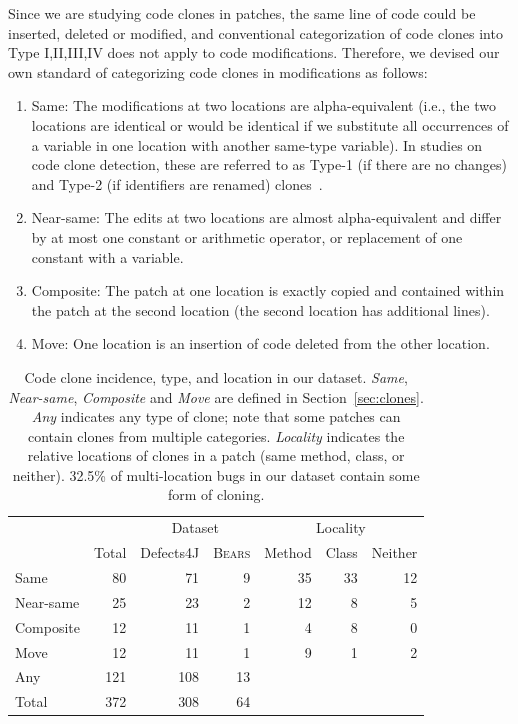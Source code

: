 \documentclass[10pt, conference]{IEEEtran}
\newcommand\bears{\textsc{Bears}\xspace}
\begin{document}
Since we are studying code clones in patches, the same line of code could be inserted, deleted or modified, and conventional categorization of code clones into Type I,II,III,IV \cite{convcodeclone} does not apply to code modifications. Therefore, we devised our own standard of categorizing code clones in modifications as follows:
\begin{enumerate}
\item Same: The modifications at two locations are alpha-equivalent (i.e., the two locations are identical or would be
identical if we substitute all occurrences of a variable in one location with
another same-type variable). In studies on code clone detection, these are
referred to as Type-1 (if there are no changes) and Type-2 (if identifiers are
renamed) clones~\cite{kclone}.
\item Near-same: The edits at two locations are almost alpha-equivalent and
  differ by at most one constant or arithmetic operator,
or replacement of one constant with a variable.
\item Composite: The patch at one location is exactly copied and contained within the patch at 
the 
second location (the second location  has additional lines).
\item Move: One location is an insertion of 
code deleted from the other location. 
\end{enumerate}

\begin{table}
{\begin{center}
\begin{tabular} {lrrrrrr}
\toprule
&&\multicolumn{2}{c}{Dataset} &\multicolumn{3}{c}{Locality}\\
& Total & Defects4J & \bears & Method & Class & Neither\\
\midrule
Same      &  80 &  71 & 9 & 35 & 33 & 12 \\
Near-same   &  25 &  23 & 2 & 12 &  8 &  5 \\
Composite &  12 &  11 & 1 &  4 &  8 &  0 \\
Move      &  12 &  11 & 1 &  9 &  1 &  2 \\
\midrule
Any       & 121 & 108 & 13\\
Total     & 372 & 308 & 64\\
\bottomrule
\end{tabular}
\end{center}
}
\caption{Code clone incidence, type, and location in our dataset. \emph{Same}, \emph{Near-same},
  \emph{Composite} and \emph{Move} are defined in Section~\ref{sec:clones}.
  \emph{Any} indicates any type of clone; note that some patches can
  contain clones from multiple categories. \emph{Locality} indicates
  the relative locations of clones in a patch (same method, class, or neither). 32.5\% of multi-location bugs
  in our dataset contain some form of cloning. }
\label{tab:clones}
\end{table}
\end{document}
